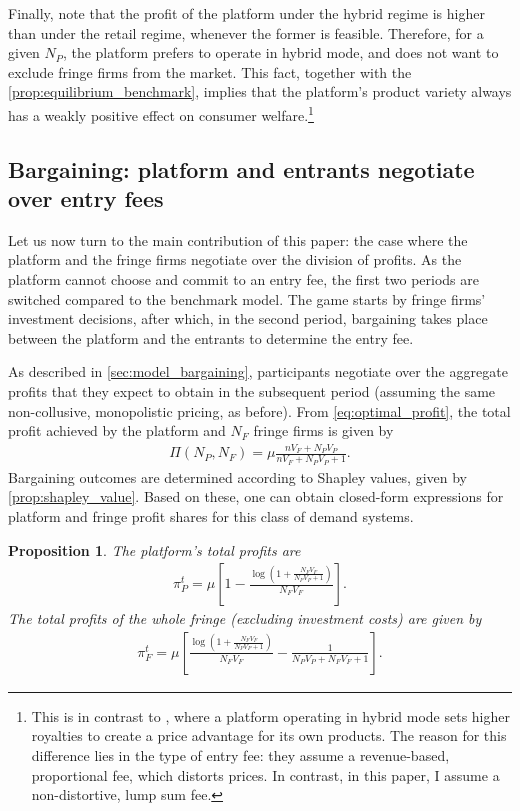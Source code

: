 \documentclass[a4paper]{article}
\newtheorem{proposition}{Proposition}
\begin{document}
Finally, note that the profit of the platform under the hybrid regime is higher than under the retail regime, whenever the former is feasible.
Therefore, for a given $N_P$, the platform prefers to operate in hybrid mode, and does not want to exclude fringe firms from the market.
This fact, together with the \cref{prop:equilibrium_benchmark}, implies that the platform's product variety always has a weakly positive effect on consumer welfare.\footnote{
    This is in contrast to \textcite{anderson2021hybrid}, where a platform operating in hybrid mode sets higher royalties to create a price advantage for its own products.
    The reason for this difference lies in the type of entry fee: they assume a revenue-based, proportional fee, which distorts prices.
    In contrast, in this paper, I assume a non-distortive, lump sum fee.
}

\subsection{Bargaining: platform and entrants negotiate over entry fees}

Let us now turn to the main contribution of this paper: the case where the platform and the fringe firms negotiate over the division of profits.
As the platform cannot choose and commit to an entry fee, the first two periods are switched compared to the benchmark model.
The game starts by fringe firms' investment decisions, after which, in the second period, bargaining takes place between the platform and the entrants to determine the entry fee.

As described in \cref{sec:model_bargaining}, participants negotiate over the aggregate profits that they expect to obtain in the subsequent period (assuming the same non-collusive, monopolistic pricing, as before).
From \cref{eq:optimal_profit}, the total profit achieved by the platform and $N_F$ fringe firms is given by
\begin{align*}
    \Pi(N_P, N_F) = \mu \frac{n V_F + N_P V_P}{n V_F + N_P V_P + 1}.
\end{align*}
Bargaining outcomes are determined according to Shapley values, given by \cref{prop:shapley_value}.
Based on these, one can obtain closed-form expressions for platform and fringe profit shares for this class of demand systems.
\begin{proposition}
    \label{prop:platform_profits_bargaining}
    The platform's total profits are
    \begin{align*}
        \pi^t_P = \mu \left[ 1 - \frac{\log \left(1 + \frac{N_F V_F}{N_P V_P + 1} \right)}{N_F V_F} \right].
    \end{align*}
    The total profits of the whole fringe (excluding investment costs) are given by
    \begin{align*}
        \pi^t_F = \mu \left[ \frac{\log \left( 1 + \frac{N_F V_F}{N_P V_P + 1} \right)}{N_F V_F} - \frac{1}{N_P V_P + N_F V_F + 1} \right].
    \end{align*}
\end{proposition}
\end{document}
